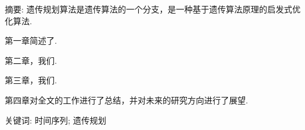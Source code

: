 {\large\heiti 摘要:} 遗传规划算法是遗传算法的一个分支，是一种基于遗传算法原理的启发式优化算法.

第一章简述了.

第二章，我们.

第三章，我们.

第四章对全文的工作进行了总结，并对未来的研究方向进行了展望.

{\large\heiti 关键词:} 时间序列; 遗传规划
